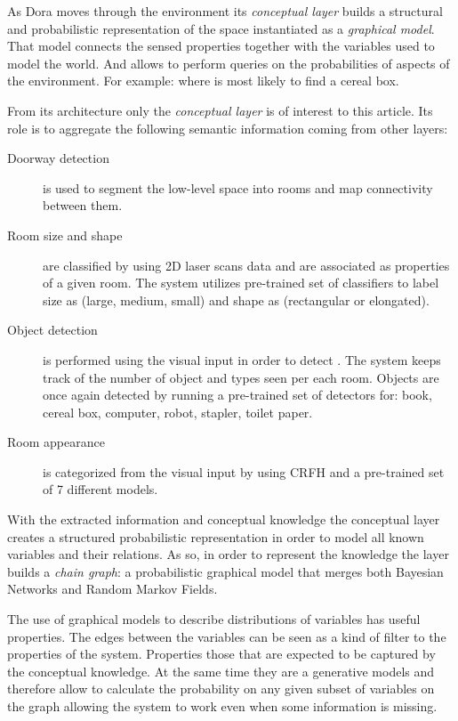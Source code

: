 \documentclass[runningheads,a4paper]{llncs}
\begin{document}
As Dora moves through the environment its \emph{conceptual layer} builds a structural and
probabilistic representation of the space instantiated as a \emph{graphical model}.
That model connects the sensed properties together with the variables used to model the world.
And allows to perform queries on the probabilities of aspects of the environment.
For example: where is most likely to find a cereal box.

From its architecture only the \emph{conceptual layer} is of interest to this article.
Its role is to aggregate the following semantic information coming from other layers:

\begin{description}
 \item[Doorway detection] is used to segment the low-level space into rooms and map connectivity between them.
 \item[Room size and shape] are classified by using 2D laser scans data and are associated as properties of a given room. The system utilizes pre-trained set of classifiers to label size as (large, medium, small) and shape as (rectangular or elongated).
 \item[Object detection] is performed using the visual input in order to detect . The system keeps track of the number of object and types seen per each room. Objects are once again detected by running a pre-trained set of detectors for: book, cereal box, computer, robot, stapler, toilet paper.
 \item[Room appearance] is categorized from the visual input by using CRFH and a pre-trained set of 7 different models.
\end{description}

With the extracted information and conceptual knowledge the conceptual layer creates a structured probabilistic representation
in order to model all known variables and their relations.
As so, in order to represent the knowledge the layer builds a \emph{chain graph}:
a probabilistic graphical model that merges both Bayesian Networks and Random Markov Fields.

The use of graphical models to describe distributions of variables has useful properties.
The edges between the variables can be seen as a kind of filter to the properties of the system.
Properties those that are expected to be captured by the conceptual knowledge.
At the same time they are a generative models and therefore allow to calculate the probability
on any given subset of variables on the graph allowing the system to work even when some
information is missing.
\end{document}
